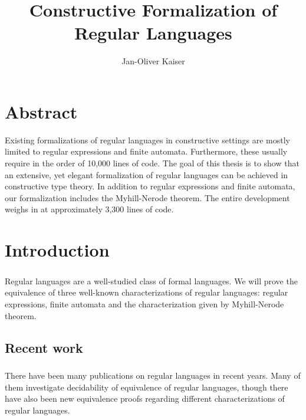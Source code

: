 \documentclass[11pt,a4paper,oneside]{book}
\title{Constructive Formalization of Regular Languages}
\author{Jan-Oliver Kaiser}
\begin{document}
    \maketitle

    \chapter*{Abstract}
    Existing formalizations of regular languages in constructive settings are mostly limited to regular expressions and finite automata. 
    Furthermore, these usually require in the order of 10,000 lines of code. %
    The goal of this thesis is to show that an extensive, yet elegant formalization of regular languages can be achieved in constructive type theory. 
    In addition to regular expressions and finite automata, our formalization includes the Myhill-Nerode theorem. 
    The entire development weighs in at approximately 3,300 lines of code. %


    \tableofcontents
    


    \chapter{Introduction}

        \paragraph{} 
            Regular languages are a well-studied class of formal languages. 
            We will prove the equivalence of three well-known characterizations of regular languages: regular expressions, finite automata and the characterization given by Myhill-Nerode theorem.

        \section{Recent work}
        
            \paragraph{} 
                There have been many publications on regular languages in recent years. Many of them investigate decidability of equivalence of regular languages, though there have also been new equivalence proofs regarding different characterizations of regular languages.
\end{document}
